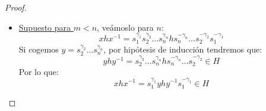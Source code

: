 \begin{prop}
\begin{proof}
\begin{description}
\begin{itemize}
\begin{itemize}
                        \end{itemize}
                    \item \underline{Supuesto para $m<n$}, veámoslo para $n$:
                        \begin{equation*}
                            xhx^{-1} = s_1^{\gamma_1}s_2^{\gamma_2}\ldots s_n^{\gamma_n}hs_n^{-\gamma_n} \ldots s_2^{-\gamma_2}s_1^{-\gamma_1}
                        \end{equation*}
                        Si cogemos $y = s_2^{\gamma_2}\ldots s_n^{\gamma_n}$, por hipótesis de inducción tendremos que:
                        \begin{equation*}
                            yhy^{-1} = s_2^{\gamma_2}\ldots s_n^{\gamma_n}hs_n^{-\gamma_n} \ldots s_2^{-\gamma_2} \in H
                        \end{equation*}
                        Por lo que:
                        \begin{equation*}
                            xhx^{-1} = s_1^{\gamma_1}yhy^{-1}s_1^{-\gamma_1} \in H
                        \end{equation*}
                \end{itemize}
        \end{description}
    \end{proof}
\end{prop}

